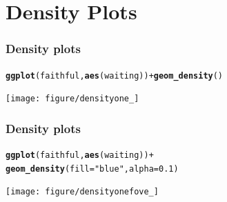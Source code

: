 \documentclass{beamer}\usepackage[]{graphicx}\usepackage[]{color}
\makeatletter
\newcommand{\hlnum}[1]{\textcolor[rgb]{0.686,0.059,0.569}{#1}}%
\newcommand{\hlstr}[1]{\textcolor[rgb]{0.192,0.494,0.8}{#1}}%
\newcommand{\hlopt}[1]{\textcolor[rgb]{0,0,0}{#1}}%
\newcommand{\hlstd}[1]{\textcolor[rgb]{0.345,0.345,0.345}{#1}}%
\newcommand{\hlkwc}[1]{\textcolor[rgb]{0.333,0.667,0.333}{#1}}%
\newcommand{\hlkwd}[1]{\textcolor[rgb]{0.737,0.353,0.396}{\textbf{#1}}}%
\newenvironment{kframe}{%
 \def\at@end@of@kframe{}%
 \ifinner\ifhmode%
  \def\at@end@of@kframe{\end{minipage}}%
  \begin{minipage}{\columnwidth}%
 \fi\fi%
 \def\FrameCommand##1{\hskip\@totalleftmargin \hskip-\fboxsep
 \colorbox{shadecolor}{##1}\hskip-\fboxsep
     \hskip-\linewidth \hskip-\@totalleftmargin \hskip\columnwidth}%
 \MakeFramed {\advance\hsize-\width
   \@totalleftmargin\z@ \linewidth\hsize
   \@setminipage}}%
 {\par\unskip\endMakeFramed%
 \at@end@of@kframe}
\newenvironment{knitrout}{}{} %
\makeatother
\begin{document}

\section*{Density Plots}
\frame{\sectionpage}


\begin{frame}[fragile]
\frametitle{Density plots}
\begin{knitrout}\footnotesize
{}\color{fgcolor}\begin{kframe}
\begin{alltt}
\hlkwd{ggplot}\hlstd{(faithful,} \hlkwd{aes}\hlstd{(waiting))} \hlopt{+} \hlkwd{geom_density}\hlstd{()}
\end{alltt}
\end{kframe}

{\centering \texttt{[image: figure/densityone\_]} 

}



\end{knitrout}
\end{frame}


\begin{frame}[fragile]
\frametitle{Density plots}
\begin{knitrout}\footnotesize
{}\color{fgcolor}\begin{kframe}
\begin{alltt}
\hlkwd{ggplot}\hlstd{(faithful,} \hlkwd{aes}\hlstd{(waiting))} \hlopt{+}
\hlkwd{geom_density}\hlstd{(}\hlkwc{fill} \hlstd{=} \hlstr{"blue"}\hlstd{,} \hlkwc{alpha} \hlstd{=} \hlnum{0.1}\hlstd{)}
\end{alltt}
\end{kframe}

{\centering \texttt{[image: figure/densityonefove\_]} 

}



\end{knitrout}
\end{frame}
\end{document}
